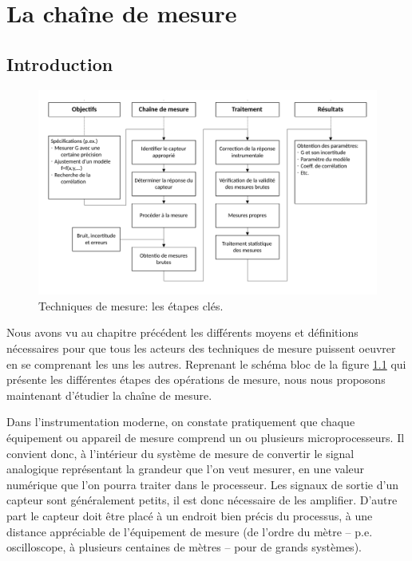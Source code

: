 \documentclass[main.tex]{subfiles}
\begin{document}
\chapter{La chaîne de mesure}
\label{chap:measurement-chain}

\section{Introduction}

\begin{figure}[ht]
    \centering
    \vspace{-5mm}
    \includegraphics[width=\textwidth]{assets/figures/chaine-de-mesure-etapes-cles.pdf}
    \caption{Techniques de mesure: les étapes clés. }
    \label{fig:flowChartTechMes_chaine_de_mesure}
\end{figure}



Nous avons vu au chapitre précédent les différents moyens et définitions nécessaires pour que tous les acteurs des techniques de mesure puissent oeuvrer en se comprenant les uns les autres. Reprenant le schéma bloc de la figure \ref{fig:flowChartTechMes_chaine_de_mesure} qui présente les différentes étapes des opérations de mesure, nous nous proposons maintenant d'étudier la chaîne de mesure.

Dans l'instrumentation moderne, on constate pratiquement que chaque équipement ou appareil de mesure comprend un ou plusieurs microprocesseurs. Il convient donc, à l'intérieur du système de mesure de convertir le signal analogique représentant la grandeur que l'on veut mesurer, en une valeur numérique que l'on pourra traiter dans le processeur. Les signaux de sortie d'un capteur sont généralement petits, il est donc nécessaire de les amplifier. D'autre part le capteur doit être placé à un endroit bien précis du processus, à une distance appréciable de l'équipement de mesure (de l'ordre du mètre -- p.e. oscilloscope, à plusieurs centaines de mètres -- pour de grands systèmes).
\end{document}
